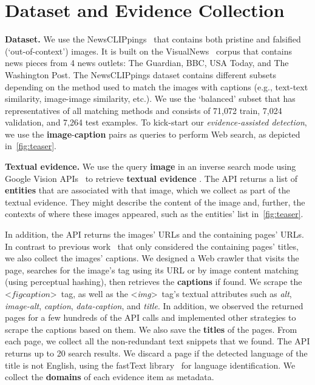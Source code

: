 \section{Dataset and Evidence Collection} \label{sec:dataset}
\textbf{Dataset.} We use the NewsCLIPpings~\cite{luo2021newsclippings} that contains both pristine and falsified (`out-of-context') images. It is built on the VisualNews~\cite{liu2020visualnews} corpus that contains news pieces from 4 news outlets: The Guardian, BBC, USA Today, and The Washington Post. The NewsCLIPpings dataset contains different subsets depending on the method used to match the images with captions (e.g., text-text similarity, image-image similarity, etc.). We use the `balanced' subset that has representatives of all matching methods and consists of 71,072 train, 7,024 validation, and 7,264 test examples. 
To kick-start our \textit{evidence-assisted detection}, we use the \textbf{\textcolor{myOrange}{image}}-\textbf{\textcolor{myblue}{caption}} pairs as queries to perform Web search, as depicted in~\autoref{fig:teaser}. 

\textbf{\textcolor{myblue}{Textual evidence.}} We use the query \textbf{\textcolor{myOrange}{image}} in an inverse search mode using Google Vision APIs~\cite{google3} to retrieve \textbf{\textcolor{myblue}{textual evidence}} . The API returns a list of \textbf{entities} that are associated with that image, which we collect as part of the textual evidence. They might describe the content of the image and, further, the contexts of where these images appeared, such as the entities' list in~\autoref{fig:teaser}.

In addition, the API returns the images' URLs and the containing pages' URLs. In contrast to previous work~\cite{zlatkova2019fact} that only considered the containing pages' titles, we also collect the images' captions. We designed a Web crawler that visits the page, searches for the image's tag using its URL or by image content matching (using perceptual hashing), then retrieves the \textbf{captions} if found. We scrape the \textless$\textit{figcaption}$\textgreater\ tag, as well as the \textless\textit{img}\textgreater\ tag's textual attributes such as \textit{alt}, \textit{image-alt}, \textit{caption}, \textit{data-caption}, and \textit{title}. In addition, we observed the returned pages for a few hundreds of the API calls and implemented other strategies to scrape the captions based on them. We also save the \textbf{titles} of the pages. From each page, we collect all the non-redundant text snippets that we found. The API returns up to 20 search results. We discard a page if the detected language of the title is not English, using the fastText library~\cite{fasttext} for language identification. We collect the \textbf{domains} of each evidence item as metadata.
%

